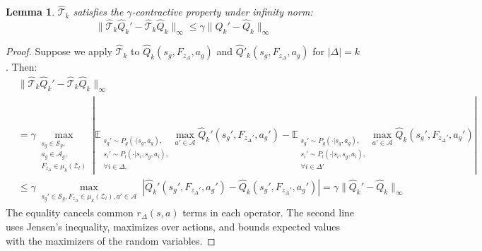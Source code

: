 \documentclass{article}
\theoremstyle{plain}
\newtheorem{lemma}[theorem]{Lemma}
\theoremstyle{definition}
\begin{document}
\begin{lemma}\label{lemma: gamma-contraction of adapted Bellman operator}
    $\hat{\mathcal{T}}_k$ satisfies the $\gamma$-contractive property under infinity norm:
    \begin{equation}\|\hat{\mathcal{T}}_k\hat{Q}_k' - \hat{\mathcal{T}}_k\hat{Q}_k\|_\infty \leq \gamma \|\hat{Q}_k' - \hat{Q}_k\|_\infty\end{equation}
\end{lemma}
\begin{proof} Suppose we apply $\hat{\mathcal{T}}_k$ to $\hat{Q}_k(s_g,F_{z_\Delta}, a_g)$ and $\hat{Q}'_k(s_g, F_{z_\Delta}, a_g)$ for $|\Delta|=k$. Then:
\begin{align*}
&\|\hat{\mathcal{T}}_k\hat{Q}_k' - \hat{\mathcal{T}}_k\hat{Q}_k\|_\infty \\
&= \gamma \max_{\substack{s_g\in \mathcal{S}_g,\\ a_g\in\mathcal{A}_g,\\ F_{z_\Delta} \in \mu_k{(\mathcal{Z}_l)}}}\!\left| \mathbb{E}_{\substack{s_g'\sim P_g(\cdot|s_g,a_g),\\ s_i'\sim P_l(\cdot|s_i, s_g,a_i),\\ \forall i\in \Delta,\\ }}\max_{a'\in\mathcal{A}}\hat{Q}_k'(s_g', F_{z_\Delta'}, a_g')- \mathbb{E}_{\substack{s_g'\sim P_g(\cdot|s_g,a_g),\\ s_i'\sim P_l(\cdot|s_i, s_g, a_i),\\\forall i\in \Delta'
}}\max_{a'\in\mathcal{A}}\hat{Q}_k(s_g', F_{z_\Delta'}, a_g')\right|\\
    &\leq \gamma  \max_{\substack{s_g' \in \mathcal{S}_g, F_{z_\Delta} \in \mu_k{(\mathcal{Z}_l)}, a'\in\mathcal{A}
        }}\left| \hat{Q}_k'(s_g', F_{z_\Delta'}, a_g') -  \hat{Q}_k(s_g', F_{z_\Delta'}, a_g')\right| = \gamma \|\hat{Q}_k' - \hat{Q}_k\|_\infty
    \end{align*}
The equality cancels common $r_\Delta(s, a)$ terms in each operator. The second line uses Jensen's inequality, maximizes over actions, and bounds expected values with the maximizers of the random variables.\qedhere
\end{proof}
\end{document}

